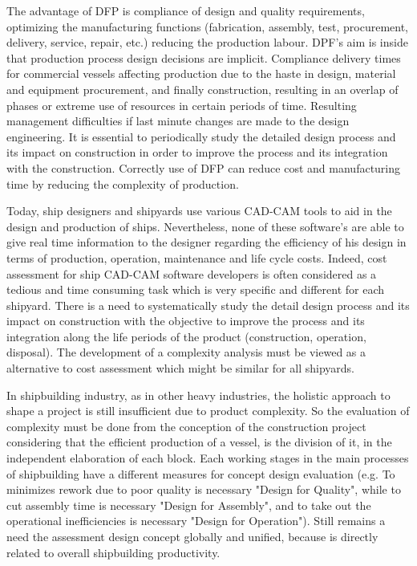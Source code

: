 The advantage of DFP is compliance of design and quality requirements, optimizing the manufacturing functions (fabrication, assembly, test, procurement, delivery, service, repair, etc.) reducing the production labour. DPF's aim is inside that production process design decisions are implicit.  Compliance delivery times for commercial vessels affecting production due to the haste in design, material and equipment procurement, and finally construction, resulting in an overlap of phases or extreme use of resources in certain periods of time. Resulting management difficulties if last minute changes are made to the design engineering. It is essential to periodically study the detailed design process and its impact on construction in order to improve the process and its integration with the construction. Correctly use of DFP  can reduce cost and manufacturing time by reducing the complexity of production.


Today, ship designers and shipyards use various CAD-CAM tools to aid in the design and production of ships. Nevertheless, none of these software's are able to give real time information to the designer regarding the efficiency of his design in terms of production, operation, maintenance and life cycle costs. Indeed, cost assessment for ship CAD-CAM software developers is often considered as a tedious and time consuming task which is very specific and different for each shipyard. There is a need to systematically study the detail design process and its impact on construction with the objective to improve the process and its integration along the life periods of the product (construction, operation, disposal). The development of a complexity analysis must be viewed as a alternative to cost assessment which might be similar for all shipyards.


In shipbuilding industry, as in other  heavy industries,  the holistic approach to shape a project is still insufficient  due to product complexity. So the evaluation of complexity must be done from the conception of the construction project considering that the efficient production of a vessel, is the division of it, in the independent elaboration of each block. Each working stages in the main processes of shipbuilding have a different measures for concept design evaluation (e.g. To minimizes rework due to poor quality is necessary "Design for Quality", while to cut assembly time is necessary "Design for Assembly", and to take out the operational inefficiencies is necessary "Design for Operation"). Still remains a need the assessment design concept globally and unified, because is directly related to overall shipbuilding productivity.
